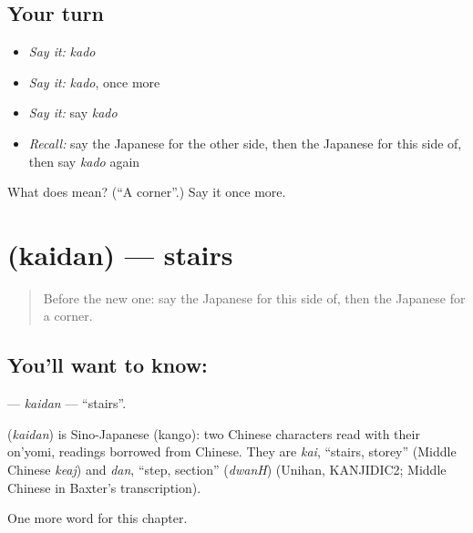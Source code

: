 \subsection*{Your turn}
\begin{itemize}
\raggedright
  \item \emph{Say it:} \emph{kado}
  \item \emph{Say it:} \emph{kado}, once more
  \item \emph{Say it:} say \emph{kado}
  \item \emph{Recall:} say the Japanese for the other side, then the Japanese for this side of, then say \emph{kado} again
\end{itemize}

\begin{tcolorbox}[breakable,colback=teal!4,colframe=teal!35!black,title={Before you move on}]
What does  mean? (\textquotedblleft{}A corner\textquotedblright{}.) Say it once more.
\end{tcolorbox}
\section[\texorpdfstring{\ja{かいだん} (kaidan)}{かいだん (kaidan)}]{ (kaidan) — stairs}

\label{lesson:JA-C79-kaidan}



\begin{quote}
Before the new one: say the Japanese for this side of, then the Japanese for a corner.
\end{quote}

\subsection*{You'll want to know: }
\textbf{} — \emph{kaidan} — \textquotedblleft{}stairs\textquotedblright{}.

\begin{cousinweb}
\textbf{} (\emph{kaidan}) is Sino-Japanese (kango): two Chinese characters read with their on'yomi, readings borrowed from Chinese. They are \emph{kai}, \textquotedblleft{}stairs, storey\textquotedblright{} (Middle Chinese \emph{keaj}) and \emph{dan}, \textquotedblleft{}step, section\textquotedblright{} (\emph{dwanH}) (Unihan, KANJIDIC2; Middle Chinese in Baxter's transcription).
\end{cousinweb}

\begin{grammarlens}[title={What you've built}]
One more word for this chapter.
\end{grammarlens}

